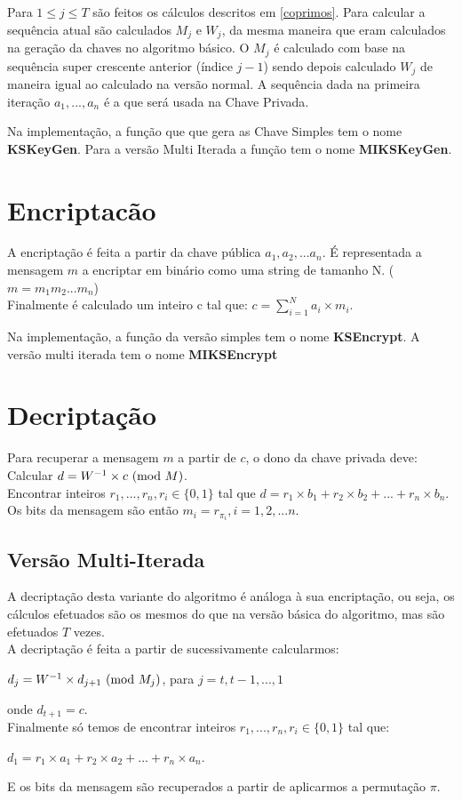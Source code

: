 \documentclass[11pt, language=portuguese]{report}
\begin{document}
Para $1 \le j \le T$ são feitos os cálculos descritos em \ref{coprimos}. Para calcular a sequência atual são calculados $M_j$ e $W_j$, da mesma maneira que eram calculados na geração da chaves no algoritmo básico. O $M_j$ é calculado com base na sequência super crescente anterior (índice $j-1$) sendo depois calculado $W_j$ de maneira igual ao calculado na versão normal. A sequência dada na primeira iteração ${a_1, ..., a_n}$ é a que será usada na Chave Privada.

Na implementação, a função que que gera as Chave Simples tem o nome \textbf{KSKeyGen}. Para a versão Multi Iterada a função tem o nome \textbf{MIKSKeyGen}.
\section{Encriptacão}
A encriptação é feita a partir da chave pública $a_1, a_2, ... a_n$. É representada a mensagem $m$ a encriptar em binário como uma string de tamanho N. ($m = m_1 m_2 ... m_n$)
\\
Finalmente é calculado um inteiro c tal que:
    $c = \sum_{i = 1}^{N} a_i \times m_i$.


Na implementação, a função da versão simples tem o nome \textbf{KSEncrypt}. A versão multi iterada tem o nome \textbf{MIKSEncrypt}

\section{Decriptação}
Para recuperar a mensagem $m$ a partir de $c$, o dono da chave privada deve:
Calcular $d = W^{-1}\times c \ (\mathrm{mod}\ M)$.
\\
Encontrar inteiros ${r_1, ..., r_n}, r_i \in \{0,1\}$ tal que $d = r_1 \times b_1 + r_2 \times b_2 + ... + r_n \times b_n$.
\\
Os bits da mensagem são então $m_i = r_{\pi_i}, i = 1, 2, ... n$.
\subsection{Versão Multi-Iterada}
A decriptação desta variante do algoritmo é análoga à sua encriptação, ou seja, os cálculos efetuados são os mesmos do que na versão básica do algoritmo, mas são efetuados $T$ vezes.
\\
A decriptação é feita a partir de sucessivamente calcularmos:
\begin{center}
	$d_j = W^{-1}\times d_{j+1} \ (\mathrm{mod}\ M_j)$, para $j = {t, t-1, ..., 1}$
\end{center}
onde $d_{t+1} = c$.
\\
Finalmente só temos de encontrar inteiros ${r_1, ..., r_n}, r_i \in \{0,1\}$ tal que:
\begin{center}
    $d_1 = r_1\times a_1 + r_2\times a_2 + ... + r_n\times a_n$.
\end{center}
E os bits da mensagem são recuperados a partir de aplicarmos a permutação $\pi$.
\end{document}
